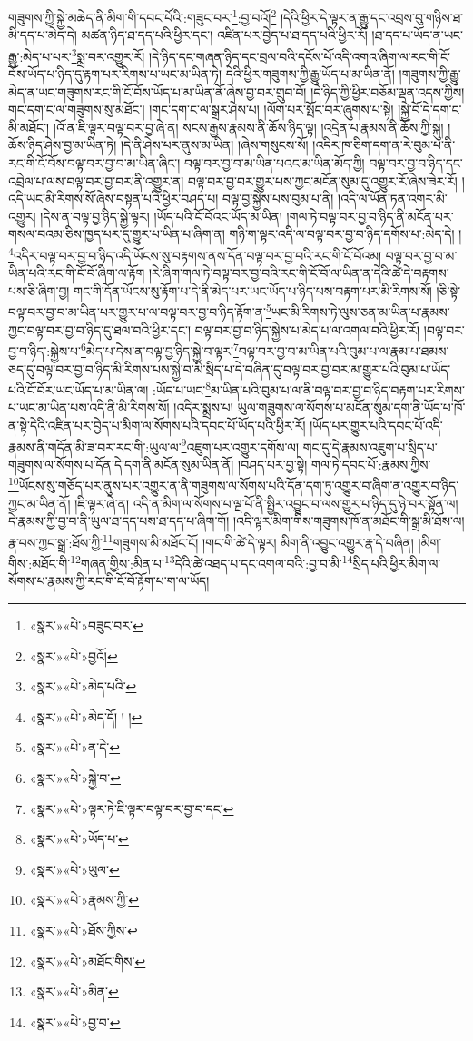 གཟུགས་ཀྱི་སྐྱེ་མཆེད་ནི་མིག་གི་དབང་པོའི་:གཟུང་བར་\footnote{«སྣར་»«པེ་»བཟུང་བར་}:བྱ་བའོ།\footnote{«སྣར་»«པེ་»བྱའོ།} །དེའི་ཕྱིར་དེ་ལྟར་ན་རྒྱུ་དང་འབྲས་བུ་གཉིས་ཐ་མི་དད་པ་མེད་དེ། མཚན་ཉིད་ཐ་དད་པའི་ཕྱིར་དང་། འཛིན་པར་བྱེད་པ་ཐ་དད་པའི་ཕྱིར་རོ། །ཐ་དད་པ་ཡོད་ན་ཡང་རྒྱུ་:མེད་པ་པར་\footnote{«སྣར་»«པེ་»མེད་པའི་}སྨྲ་བར་འགྱུར་རོ། །དེ་ཉིད་དང་གཞན་ཉིད་དང་བྲལ་བའི་དངོས་པོ་འདི་འགའ་ཞིག་ལ་རང་གི་ངོ་བོས་ཡོད་པ་ཉིད་དུ་རྟག་པར་རིགས་པ་ཡང་མ་ཡིན་ཏེ། དེའི་ཕྱིར་གཟུགས་ཀྱི་རྒྱུ་ཡོད་པ་མ་ཡིན་ནོ། །གཟུགས་ཀྱི་རྒྱུ་མེད་ན་ཡང་གཟུགས་རང་གི་ངོ་བོས་ཡོད་པ་མ་ཡིན་ནོ་ཞེས་བྱ་བར་གྲུབ་བོ། །དེ་ཉིད་ཀྱི་ཕྱིར་བཅོམ་ལྡན་འདས་ཀྱིས། གང་དག་ང་ལ་གཟུགས་སུ་མཐོང་། །གང་དག་ང་ལ་སྒྲར་ཤེས་པ། །ལོག་པར་སྤོང་བར་ཞུགས་པ་སྟེ། །སྐྱེ་བོ་དེ་དག་ང་མི་མཐོང་། །འོ་ན་ཇི་ལྟར་བལྟ་བར་བྱ་ཞེ་ན། སངས་རྒྱས་རྣམས་ནི་ཆོས་ཉིད་ལྟ། །འདྲེན་པ་རྣམས་ནི་ཆོས་ཀྱི་སྐུ། །ཆོས་ཉིད་ཤེས་བྱ་མ་ཡིན་ཏེ། །དེ་ནི་ཤེས་པར་ནུས་མ་ཡིན། །ཞེས་གསུངས་སོ། །འདིར་ཁ་ཅིག་དག་ན་རེ་བུམ་པ་ནི་རང་གི་ངོ་བོས་བལྟ་བར་བྱ་བ་མ་ཡིན་ཞིང་། བལྟ་བར་བྱ་བ་མ་ཡིན་པའང་མ་ཡིན་མོད་ཀྱི། བལྟ་བར་བྱ་བ་ཉིད་དང་འབྲེལ་པ་ལས་བལྟ་བར་བྱ་བར་ནི་འགྱུར་ན། བལྟ་བར་བྱ་བར་གྱུར་པས་ཀྱང་མངོན་སུམ་དུ་འགྱུར་རོ་ཞེས་ཟེར་རོ། །འདི་ཡང་མི་རིགས་སོ་ཞེས་བསྟན་པའི་ཕྱིར་བཤད་པ། བལྟ་བྱ་སྐྱེས་པས་བུམ་པ་ནི། །འདི་ལ་ཡོན་ཏན་འགར་མི་འགྱུར། །དེས་ན་བལྟ་བྱ་ཉིད་སྐྱེ་ལྟར། །ཡོད་པའི་ངོ་བོའང་ཡོད་མ་ཡིན། །གལ་ཏེ་བལྟ་བར་བྱ་བ་ཉིད་ནི་མངོན་པར་གསལ་བའམ་ཅིས་ཁྱད་པར་དུ་གྱུར་པ་ཡིན་པ་ཞིག་ན། གཉི་ག་ལྟར་འདི་ལ་བལྟ་བར་བྱ་བ་ཉིད་དགོས་པ་:མེད་དེ། །\footnote{«སྣར་»«པེ་»མེད་དོ། ། །}འདིར་བལྟ་བར་བྱ་བ་ཉིད་འདི་ཡོངས་སུ་བརྟགས་ནས་དོན་བལྟ་བར་བྱ་བའི་རང་གི་ངོ་བོའམ། བལྟ་བར་བྱ་བ་མ་ཡིན་པའི་རང་གི་ངོ་བོ་ཞིག་ལ་རྟོག །རེ་ཞིག་གལ་ཏེ་བལྟ་བར་བྱ་བའི་རང་གི་ངོ་བོ་ལ་ཡིན་ན་དེའི་ཚེ་དེ་བརྟགས་པས་ཅི་ཞིག་བྱ། གང་གི་དོན་ཡོངས་སུ་རྟོག་པ་དེ་ནི་མེད་པར་ཡང་ཡོད་པ་ཉིད་པས་བརྟག་པར་མི་རིགས་སོ། །ཅི་སྟེ་བལྟ་བར་བྱ་བ་མ་ཡིན་པར་གྱུར་པ་ལ་བལྟ་བར་བྱ་བ་ཉིད་རྟོག་ན་\footnote{«སྣར་»«པེ་»ན་དེ་}ཡང་མི་རིགས་ཏེ་ལུས་ཅན་མ་ཡིན་པ་རྣམས་ཀྱང་བལྟ་བར་བྱ་བ་ཉིད་དུ་ཐལ་བའི་ཕྱིར་དང་། བལྟ་བར་བྱ་བ་ཉིད་སྐྱེས་པ་མེད་པ་ལ་འགལ་བའི་ཕྱིར་རོ། །བལྟ་བར་བྱ་བ་ཉིད་:སྐྱེས་པ་\footnote{«སྣར་»«པེ་»སྐྱེ་བ་}མེད་པ་དེས་ན་བལྟ་བྱ་ཉིད་སྐྱེ་བ་ལྟར་\footnote{«སྣར་»«པེ་»ལྟར་ཏེ་ཇི་ལྟར་བལྟ་བར་བྱ་བ་དང་}བལྟ་བར་བྱ་བ་མ་ཡིན་པའི་བུམ་པ་ལ་རྣམ་པ་ཐམས་ཅད་དུ་བལྟ་བར་བྱ་བ་ཉིད་མི་རིགས་པས་སྐྱེ་བ་མི་སྲིད་པ་དེ་བཞིན་དུ་བལྟ་བར་བྱ་བར་མ་གྱུར་པའི་བུམ་པ་ཡོད་པའི་ངོ་བོར་ཡང་ཡོད་པ་མ་ཡིན་ལ། :ཡོད་པ་ཡང་\footnote{«སྣར་»«པེ་»ཡོད་པ་}མ་ཡིན་པའི་བུམ་པ་ལ་ནི་བལྟ་བར་བྱ་བ་ཉིད་བརྟག་པར་རིགས་པ་ཡང་མ་ཡིན་པས་འདི་ནི་མི་རིགས་སོ། །འདིར་སྨྲས་པ། ཡུལ་གཟུགས་ལ་སོགས་པ་མངོན་སུམ་དག་ནི་ཡོད་པ་ཁོ་ན་སྟེ་དེའི་འཛིན་པར་བྱེད་པ་མིག་ལ་སོགས་པའི་དབང་པོ་ཡོད་པའི་ཕྱིར་རོ། །ཡོད་པར་གྱུར་པའི་དབང་པོ་འདི་རྣམས་ནི་གདོན་མི་ཟ་བར་རང་གི་:ཡུལ་ལ་\footnote{«སྣར་»«པེ་»ཡུལ་}འཇུག་པར་འགྱུར་དགོས་ལ། གང་དུ་དེ་རྣམས་འཇུག་པ་སྲིད་པ་གཟུགས་ལ་སོགས་པ་དོན་དེ་དག་ནི་མངོན་སུམ་ཡིན་ནོ། །བཤད་པར་བྱ་སྟེ། གལ་ཏེ་དབང་པོ་:རྣམས་ཀྱིས་\footnote{«སྣར་»«པེ་»རྣམས་ཀྱི་}ཡོངས་སུ་གཅོད་པར་ནུས་པར་འགྱུར་ན་ནི་གཟུགས་ལ་སོགས་པའི་དོན་དག་ཏུ་འགྱུར་བ་ཞིག་ན་འགྱུར་བ་ཉིད་ཀྱང་མ་ཡིན་ནོ། །ཇི་ལྟར་ཞེ་ན། འདི་ན་མིག་ལ་སོགས་པ་ལྔ་པོ་ནི་སྤྱིར་འབྱུང་བ་ལས་གྱུར་པ་ཉིད་དུ་ཉེ་བར་སྟོན་ལ། དེ་རྣམས་ཀྱི་བྱ་བ་ནི་ཡུལ་ཐ་དད་པས་ཐ་དད་པ་ཞིག་གོ། །འདི་ལྟར་མིག་གིས་གཟུགས་ཁོ་ན་མཐོང་གི་སྒྲ་མི་ཐོས་ལ། རྣ་བས་ཀྱང་སྒྲ་:ཐོས་ཀྱི་\footnote{«སྣར་»«པེ་»ཐོས་ཀྱིས་}གཟུགས་མི་མཐོང་ངོ། །གང་གི་ཚེ་དེ་ལྟར། མིག་ནི་འབྱུང་འགྱུར་རྣ་དེ་བཞིན། །མིག་གིས་:མཐོང་གི་\footnote{«སྣར་»«པེ་»མཐོང་གིས་}གཞན་གྱིས་:མིན་པ་\footnote{«སྣར་»«པེ་»མིན་}དེའི་ཚེ་འཐད་པ་དང་འགལ་བའི་:བྱ་བ་མི་\footnote{«སྣར་»«པེ་»བྱ་བ་}སྲིད་པའི་ཕྱིར་མིག་ལ་སོགས་པ་རྣམས་ཀྱི་རང་གི་ངོ་བོ་རྟོག་པ་ག་ལ་ཡོད། 